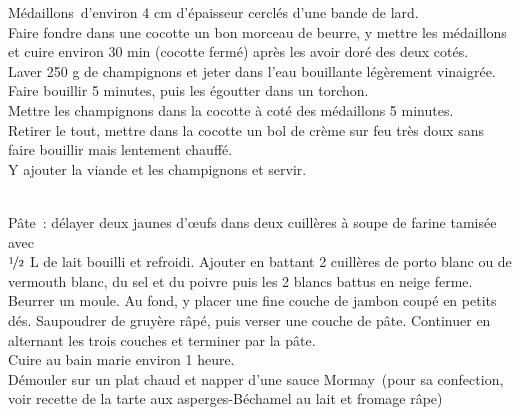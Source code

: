 \begin{minipage}[c]{\textwidth}
Médaillons d’environ 4 cm d’épaisseur cerclés d’une bande de lard. \\
Faire fondre dans une cocotte un bon morceau de beurre, y mettre les médaillons et cuire environ 30 min (cocotte fermé) après les avoir doré des deux cotés.\\
Laver 250 g de champignons et jeter dans l’eau bouillante légèrement vinaigrée.  Faire bouillir 5 minutes, puis les égoutter dans un torchon. \\
Mettre les champignons dans la cocotte à coté des médaillons 5 minutes.\\
Retirer le tout, mettre dans la cocotte un bol de crème sur feu très doux sans faire bouillir mais lentement chauffé. \\
Y ajouter la viande et les champignons et servir.\\
\\

\end{minipage}

\begin{minipage}[c]{\textwidth}
Pâte : délayer deux jaunes d’œufs dans deux cuillères à soupe de farine tamisée avec \\
$\nicefrac{1}{2}$ L de lait bouilli et refroidi. Ajouter en battant 2 cuillères de porto blanc ou de vermouth blanc, du sel et du poivre puis les 2 blancs battus en neige ferme.\\
Beurrer un moule. Au fond, y placer une fine couche de jambon coupé en petits dés. Saupoudrer de gruyère râpé, puis verser une couche de pâte. Continuer en alternant les trois couches et terminer par la pâte.\\
Cuire au bain marie environ 1 heure. \\
Démouler sur un plat chaud et napper d’une sauce Mormay (pour sa confection, voir recette de la tarte aux asperges-Béchamel au lait et fromage râpe)\\
\\

\end{minipage}

